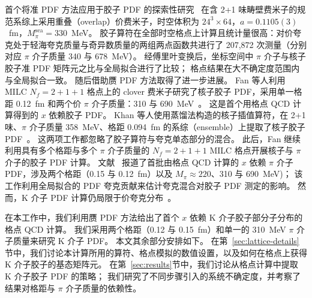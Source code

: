 首个将准 PDF 方法应用于胶子 PDF 的探索性研究~\cite{Fan:2018dxu} 在含 2+1 味畴壁费米子的规范系综上采用重叠（overlap）价费米子，时空体积为 $24^3\times 64$，$a=0.1105(3)$~fm，$M_\pi^\text{sea}=330$~MeV。
胶子算符在全部时空格点上计算且统计量很高：对价夸克处于轻海夸克质量与奇异数质量的两组两点函数共进行了 207,872 次测量（分别对应 $\pi$ 介子质量 340 与 678~MeV）。
经傅里叶变换后，坐标空间中 $\pi$ 介子与核子胶子准 PDF 矩阵元之比与全局拟合进行了比较；
格点结果在大不确定度范围内与全局拟合一致。
随后借助赝 PDF 方法取得了进一步进展。
Fan 等人利用 MILC $N_f=2+1+1$ 格点上的 clover 费米子研究了核子胶子 PDF，采用单一格距 0.12~fm 和两个价 $\pi$ 介子质量：310 与 690~MeV~\cite{Fan:2020cpa}。
这是首个用格点 QCD 计算得到的 $x$ 依赖胶子 PDF。
Khan 等人使用蒸馏法构造的核子插值算符，在 2+1 味、$\pi$ 介子质量 358~MeV、格距 0.094~fm 的系综（ensemble）上提取了核子胶子 PDF~\cite{HadStruc:2021wmh}。
这两项工作都忽略了胶子算符与夸克单态部分的混合。
此后，Fan 继续利用具有多个格距与多个 $\pi$ 介子质量的 $N_f=2+1+1$ MILC 格点开展核子与 $\pi$ 介子的胶子 PDF 计算。
文献~\cite{Fan:2021bcr} 报道了首批由格点 QCD 计算的 $x$ 依赖 $\pi$ 介子 PDF，涉及两个格距（0.15 与 0.12~fm）以及 $M_\pi \approx 220$、310 与 690~MeV)；
该工作利用全局拟合的 PDF 夸克贡献来估计夸克混合对胶子 PDF 测定的影响。
然而，K 介子 PDF 计算仍局限于价夸克分布~\cite{Lin:2020ssv}。

在本工作中，我们利用赝 PDF 方法给出了首个 $x$ 依赖 K 介子胶子部分子分布的格点 QCD 计算。
我们采用两个格距（0.12 与 0.15~fm）和单一的 310~MeV $\pi$ 介子质量来研究 K 介子 PDF。
本文其余部分安排如下。
在第~\ref{sec:lattice-details}节中，我们讨论本计算所用的算符、格点模拟的数值设置，以及如何在格点上获得 K 介子胶子的基态矩阵元。
在第~\ref{sec:results}节中，我们讨论从格点计算中提取 K 介子胶子 PDF 的策略；
我们研究了不同步骤引入的系统不确定度，并考察了结果对格距与 $\pi$ 介子质量的依赖性。
